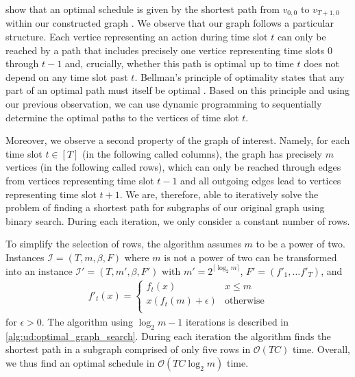 \citeauthor*{Albers2018} show that an optimal schedule is given by the shortest path from $v_{0,0}$ to $v_{T+1,0}$ within our constructed graph \cite{Albers2018}. We observe that our graph follows a particular structure. Each vertice representing an action during time slot $t$ can only be reached by a path that includes precisely one vertice representing time slots $0$ through $t - 1$ and, crucially, whether this path is optimal up to time $t$ does not depend on any time slot past $t$. Bellman's principle of optimality states that any part of an optimal path must itself be optimal \cite{Bellman1954}. Based on this principle and using our previous observation, we can use dynamic programming to sequentially determine the optimal paths to the vertices of time slot $t$.

Moreover, we observe a second property of the graph of interest. Namely, for each time slot $t \in [T]$ (in the following called columns), the graph has precisely $m$ vertices (in the following called rows), which can only be reached through edges from vertices representing time slot $t - 1$ and all outgoing edges lead to vertices representing time slot $t + 1$. We are, therefore, able to iteratively solve the problem of finding a shortest path for subgraphs of our original graph using binary search. During each iteration, we only consider a constant number of rows.

To simplify the selection of rows, the algorithm assumes $m$ to be a power of two. Instances $\mathcal{I} = (T, m, \beta, F)$ where $m$ is not a power of two can be transformed into an instance $\mathcal{I}' = (T, m', \beta, F')$ with $m' = 2^{\lceil \log_2 m \rceil}$, $F' = (f'_1, \dots f'_T)$, and \begin{align*}
    f'_t(x) = \begin{cases}
        f_t(x) & x \leq m \\
        x (f_t(m) + \epsilon) & \text{otherwise} \\
    \end{cases}
\end{align*} for $\epsilon > 0$. The algorithm using $\log_2 m - 1$ iterations is described in \autoref{alg:ud:optimal_graph_search}. During each iteration the algorithm finds the shortest path in a subgraph comprised of only five rows in $\mathcal{O}(T C)$ time. Overall, we thus find an optimal schedule in $\mathcal{O}(T C \log_2 m)$ time.

